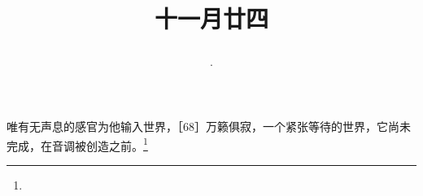 \title{\date[d=24,m=12,y=2024][year:cn-y,年,month:cn,day:cn,日,·,weekday]·十一月廿四 }
唯有无声息的感官为他输入世界，［68］万籁俱寂，一个紧张等待的世界，它尚未完成，在音调被创造之前。\footnote{ }


